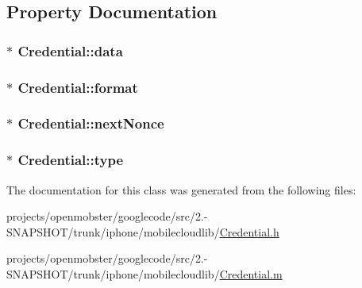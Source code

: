 \subsection{\-Property \-Documentation}
\hypertarget{interface_credential_ac50e1dfa9c8939fd34b9492ddde18255}{
\subsubsection[{data}]{ $\ast$ \-Credential\-::data}}
\label{interface_credential_ac50e1dfa9c8939fd34b9492ddde18255}
\hypertarget{interface_credential_a5fa39aa62f0e03e78cf094a32c3afac9}{
\subsubsection[{format}]{ $\ast$ \-Credential\-::format}}
\label{interface_credential_a5fa39aa62f0e03e78cf094a32c3afac9}
\hypertarget{interface_credential_a8a81638fcab7c1d2a61dba4d1f8fdbb8}{
\subsubsection[{next\-Nonce}]{ $\ast$ \-Credential\-::next\-Nonce}}
\label{interface_credential_a8a81638fcab7c1d2a61dba4d1f8fdbb8}
\hypertarget{interface_credential_a546016ff2be0b8dc44e4ee82c52b5402}{
\subsubsection[{type}]{ $\ast$ \-Credential\-::type}}
\label{interface_credential_a546016ff2be0b8dc44e4ee82c52b5402}


\-The documentation for this class was generated from the following files\-:\begin{DoxyCompactItemize}
\item 
projects/openmobster/googlecode/src/2.-\/\-S\-N\-A\-P\-S\-H\-O\-T/trunk/iphone/mobilecloudlib/\hyperlink{_credential_8h}{\-Credential.\-h}\item 
projects/openmobster/googlecode/src/2.-\/\-S\-N\-A\-P\-S\-H\-O\-T/trunk/iphone/mobilecloudlib/\hyperlink{_credential_8m}{\-Credential.\-m}\end{DoxyCompactItemize}
